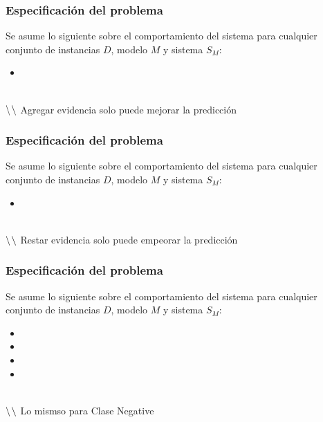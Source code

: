 \begin{frame}[t]
\frametitle{Especificaci\'on del problema}
\vspace{6mm}
Se asume lo siguiente sobre el comportamiento del sistema para cualquier conjunto de instancias $D$, modelo $M$ y sistema $S_{M}$: \\
\vspace{4mm}
\begin{minipage}{0.6\textwidth}
\begin{itemize}
\item \APmas
\end{itemize}
\end{minipage} \\
\vspace{4mm}
$\symbol{92}$$\symbol{92}$ Agregar evidencia solo puede mejorar la predicci\'on
\end{frame}



\begin{frame}[t]
\frametitle{Especificaci\'on del problema}
\vspace{6mm}
Se asume lo siguiente sobre el comportamiento del sistema para cualquier conjunto de instancias $D$, modelo $M$ y sistema $S_{M}$: \\
\vspace{4mm}
\begin{minipage}{0.6\textwidth}
\begin{itemize}
\vspace{12.5mm}
\item \APmenos
\end{itemize}
\end{minipage} \\
\vspace{4mm}
$\symbol{92}$$\symbol{92}$ Restar evidencia solo puede empeorar la predicci\'on
\end{frame}



\begin{frame}[t]
\frametitle{Especificaci\'on del problema}
\vspace{6mm}
Se asume lo siguiente sobre el comportamiento del sistema para cualquier conjunto de instancias $D$, modelo $M$ y sistema $S_{M}$: \\
\vspace{4mm}
\begin{minipage}{0.6\textwidth}
\begin{itemize}
\item \APmas
\vspace{2mm}
\item \APmenos
\vspace{2mm}
\item \ANmas
\vspace{2mm}
\item \ANmenos
\end{itemize}
\end{minipage} \\
\vspace{4mm}
$\symbol{92}$$\symbol{92}$ Lo mismso para Clase Negative
\end{frame}



